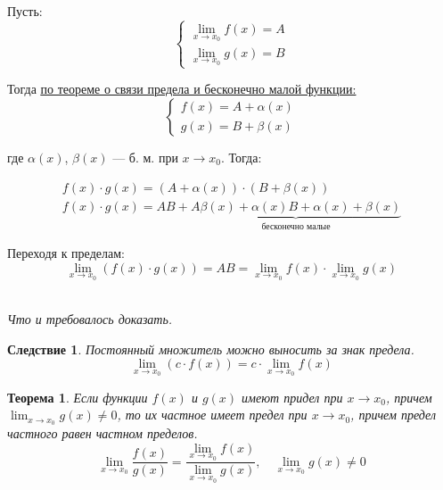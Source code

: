 \documentclass[a4paper,12pt,oneside]{extbook}
\newcommand{\newpar}{$ $\par\nobreak\ignorespaces}
\theoremstyle{numbered}
\theoremstyle{unnumbered}
\theoremstyle{named}
\newtheorem{theorem}{Теорема}[section]
\theoremstyle{unnumbered}
\theoremstyle{named}
\theoremstyle{named}
\newtheorem*{consequence}{Следствие}
\theoremstyle{named}
\renewenvironment{proof}[1][]{\breakenv[Доказательство]{\if\relax\detokenize{#1}\relax\else\;\fi}{\textbf{#1}}}{\smallskip\newpar \hfill\textit{Что и требовалось доказать.}}
\newcommand{\plink}[2]{\hyperref[#1]{\color{blue}\underline{#2}}}
\begin{document}
\begin{proof}
    Пусть:
    \[
        \begin{cases}
            \displaystyle
            \lim_{x \to x_0}{f(x)} = A \\
            \displaystyle
            \lim_{x \to x_0}{g(x)} = B
        \end{cases}
    \]

    Тогда \plink{theorem:Теорема о связи функции, ее предела и бесконечно малой функции}{по теореме о связи предела и бесконечно малой функции:}
    \[
        \begin{cases}
            f(x) = A + \alpha(x) \\
            g(x) = B + \beta(x)
        \end{cases}
    \]

    где \(\alpha(x)\), \(\beta(x)\) — б. м. при \(x \to x_0\). Тогда:

    \begin{gather*}
        f(x) \cdot g(x) = (A + \alpha(x)) \cdot (B + \beta(x)) \\
        f(x) \cdot g(x) = AB + \underbrace{A \beta(x) + \alpha(x) B + \alpha(x) + \beta(x)}_{\text{бесконечно малые}}
    \end{gather*}

    Переходя к пределам:
    \[
        \lim_{x \to x_0}{(f(x) \cdot g(x))} = AB =  \lim_{x \to x_0}{f(x)} \cdot \lim_{x \to x_0}{g(x)}
    \]
\end{proof}

\begin{consequence}
    Постоянный множитель можно выносить за знак предела.
    \[
        \lim_{x \to x_0}{(c \cdot f(x))} = c \cdot \lim_{x \to x_0}{f(x)}
    \]
\end{consequence}

\begin{theorem}
    Если функции \(f(x)\) и \(g(x)\) имеют придел при \(x \to x_0\), причем \(\displaystyle \lim_{x \to x_0}{g(x)} \neq 0\), то их частное имеет предел при \(x \to x_0\), причем предел частного равен частном пределов.
    \[
        \lim_{x \to x_0}{\frac{f(x)}{g(x)}} = \frac{\displaystyle \lim_{x \to x_0}{f(x)}}{\displaystyle \lim_{x \to x_0}{g(x)}}, \quad \lim_{x \to x_0}{g(x)} \neq 0
    \]
\end{theorem}
\end{document}
